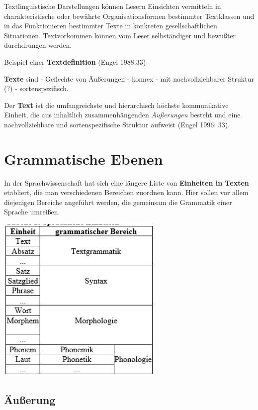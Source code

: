 \documentclass[
  letterpaper,
]{scrbook}
\begin{document}
Textlinguistische Darstellungen können Lesern Einsichten vermitteln in
charakteristische oder bewährte Organisationsformen bestimmter
Textklassen und in das Funktionieren bestimmter Texte in konkreten
gesellschaftlichen Situationen. Textvorkommen können vom Leser
selbständiger und bewußter durchdrungen werden.

Beispiel einer \textbf{Textdefinition} (Engel 1988:33)

\textbf{Texte} sind - Geflechte von Äußerungen - konnex - mit
nachvollziehbarer Struktur (?) - sortenspezifisch.

Der \textbf{Text} ist die umfangreichste und hierarchisch höchste
kommunikative Einheit, die aus inhaltlich zusammenhängenden
\emph{Äußerungen} besteht und eine nachvollziehbare und
sortenspezifische Struktur aufweist (Engel 1996: 33).

\hypertarget{grammatische-ebenen}{%
\section{Grammatische Ebenen}\label{grammatische-ebenen}}

In der Sprachwissenschaft hat sich eine längere Liste von
\textbf{Einheiten in Texten} etabliert, die man verschiedenen Bereichen
zuordnen kann. Hier sollen vor allem diejenigen Bereiche angeführt
werden, die gemeinsam die Grammatik einer Sprache umreißen.

\includegraphics[width=0.6\textwidth,height=\textheight]{./pictures/grammatische_bereiche.png}

\hypertarget{uxe4uuxdferung}{%
\subsection{Äußerung}\label{uxe4uuxdferung}}
\end{document}
